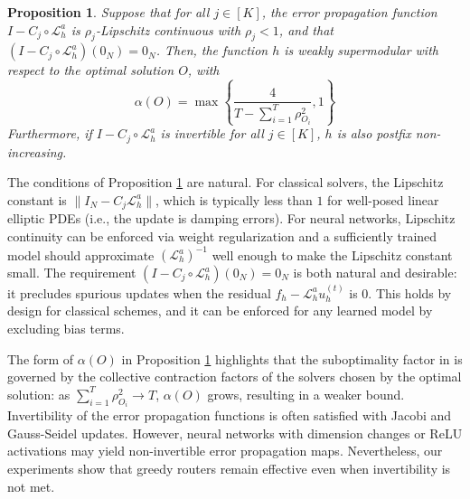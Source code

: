 \documentclass{article}
\newtheorem{proposition}[theorem]{Proposition}
\begin{document}
\begin{proposition} \label{th:weaklyalphasupermodular}
    Suppose that for all $j \in [K]$, the error propagation function $I - C_j \circ \mathcal{L}_h^a$ is $\rho_j$-Lipschitz continuous with $\rho_j < 1$, and that $(I - C_j \circ \mathcal{L}_h^a) (0_N) = 0_N$. Then, the function $h$ is weakly supermodular with respect to the optimal solution $O$, with 
    \begin{equation*}
        \alpha(O) = \max\left\{\frac{4}{T - \sum_{i = 1}^{T} \rho_{O_i}^2} , 1\right\}
    \end{equation*}
    Furthermore, if $I - C_j \circ \mathcal{L}_h^a$ is invertible for all $j \in [K]$, $h$ is also postfix non-increasing.
\end{proposition}
The conditions of Proposition \ref{th:weaklyalphasupermodular} are natural. For classical solvers, the Lipschitz constant is $\|I_N - C_j \mathcal{L}^a_h\|$, which is typically less than $1$
for well-posed linear elliptic PDEs (i.e., the update is damping errors). 
For neural networks, Lipschitz continuity can be enforced via weight regularization \citep{gouk2021regularisation} and a sufficiently trained model should approximate $(\mathcal{L}^a_h)^{-1}$ well enough to make the Lipschitz constant small.
The requirement $(I - C_j \circ \mathcal{L}_h^a) (0_N) = 0_N$
is both natural and desirable: it precludes spurious updates when the residual $f_h - \mathcal{L}^a_h u_h^{(t)}$ is $0$. This holds by design for classical schemes, and it can be enforced for any learned model by excluding bias terms.

The form of $\alpha(O)$ in Proposition \ref{th:weaklyalphasupermodular} highlights that the suboptimality factor in  is governed by the collective contraction factors of the solvers chosen by the optimal solution: as $\sum_{i = 1}^{T} \rho_{O_i}^2 \to T$, $\alpha(O)$ grows, resulting in a weaker bound. 
Invertibility of the error propagation functions is often satisfied with Jacobi and Gauss-Seidel updates. However, neural networks with dimension changes or ReLU activations may yield non-invertible error propagation maps. Nevertheless, our experiments show that greedy routers remain effective even when invertibility is not met. 
\end{document}
